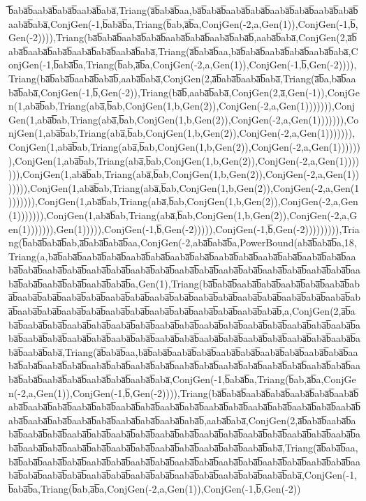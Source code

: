 ̅b̅aba̅b̅aaba̅b̅aba̅b̅aaba̅b̅aba̅,Triang(a̅b̅aba̅b̅aa,ba̅b̅aba̅b̅aaba̅b̅aba̅b̅aaba̅b̅aba̅b̅aaba̅b̅aba̅b̅aaba̅b̅aba̅,ConjGen(-1,b̅aba̅b̅a,Triang(b̅ab,a̅b̅a,ConjGen(-2,a,Gen(1)),ConjGen(-1,b̅,Gen(-2)))),Triang(ba̅b̅aba̅b̅aaba̅b̅aba̅b̅aaba̅b̅aba̅b̅aaba̅b̅aba̅b̅,aaba̅b̅aba̅,ConjGen(2,a̅b̅aba̅b̅aaba̅b̅aba̅b̅aaba̅b̅aba̅b̅aaba̅b̅aba̅,Triang(a̅b̅aba̅b̅aa,ba̅b̅aba̅b̅aaba̅b̅aba̅b̅aaba̅b̅aba̅,ConjGen(-1,b̅aba̅b̅a,Triang(b̅ab,a̅b̅a,ConjGen(-2,a,Gen(1)),ConjGen(-1,b̅,Gen(-2)))),Triang(ba̅b̅aba̅b̅aaba̅b̅aba̅b̅,aaba̅b̅aba̅,ConjGen(2,a̅b̅aba̅b̅aaba̅b̅aba̅,Triang(a̅b̅a,ba̅b̅aaba̅b̅aba̅,ConjGen(-1,b̅,Gen(-2)),Triang(ba̅b̅,aaba̅b̅aba̅,ConjGen(2,a̅,Gen(-1)),ConjGen(1,aba̅b̅ab,Triang(aba̅,b̅ab,ConjGen(1,b,Gen(2)),ConjGen(-2,a,Gen(1))))))),ConjGen(1,aba̅b̅ab,Triang(aba̅,b̅ab,ConjGen(1,b,Gen(2)),ConjGen(-2,a,Gen(1))))))),ConjGen(1,aba̅b̅ab,Triang(aba̅,b̅ab,ConjGen(1,b,Gen(2)),ConjGen(-2,a,Gen(1))))))),ConjGen(1,aba̅b̅ab,Triang(aba̅,b̅ab,ConjGen(1,b,Gen(2)),ConjGen(-2,a,Gen(1))))))),ConjGen(1,aba̅b̅ab,Triang(aba̅,b̅ab,ConjGen(1,b,Gen(2)),ConjGen(-2,a,Gen(1))))))),ConjGen(1,aba̅b̅ab,Triang(aba̅,b̅ab,ConjGen(1,b,Gen(2)),ConjGen(-2,a,Gen(1))))))),ConjGen(1,aba̅b̅ab,Triang(aba̅,b̅ab,ConjGen(1,b,Gen(2)),ConjGen(-2,a,Gen(1))))))),ConjGen(1,aba̅b̅ab,Triang(aba̅,b̅ab,ConjGen(1,b,Gen(2)),ConjGen(-2,a,Gen(1))))))),ConjGen(1,aba̅b̅ab,Triang(aba̅,b̅ab,ConjGen(1,b,Gen(2)),ConjGen(-2,a,Gen(1))))))),Gen(1))))),ConjGen(-1,b̅,Gen(-2))))),ConjGen(-1,b̅,Gen(-2))))))))),Triang(b̅aba̅b̅aba̅b̅ab,a̅b̅aba̅b̅aba̅b̅aa,ConjGen(-2,aba̅b̅aba̅b̅a,PowerBound(aba̅b̅aba̅b̅a,18,Triang(a,ba̅b̅aba̅b̅aaba̅b̅aba̅b̅aaba̅b̅aba̅b̅aaba̅b̅aba̅b̅aaba̅b̅aba̅b̅aaba̅b̅aba̅b̅aaba̅b̅aba̅b̅aaba̅b̅aba̅b̅aaba̅b̅aba̅b̅aaba̅b̅aba̅b̅aaba̅b̅aba̅b̅aaba̅b̅aba̅b̅aaba̅b̅aba̅b̅aaba̅b̅aba̅b̅aaba̅b̅aba̅b̅aaba̅b̅aba̅b̅aaba̅b̅aba̅b̅aaba̅b̅aba̅b̅a,Gen(1),Triang(ba̅b̅aba̅b̅aaba̅b̅aba̅b̅aaba̅b̅aba̅b̅aaba̅b̅aba̅b̅aaba̅b̅aba̅b̅aaba̅b̅aba̅b̅aaba̅b̅aba̅b̅aaba̅b̅aba̅b̅aaba̅b̅aba̅b̅aaba̅b̅aba̅b̅aaba̅b̅aba̅b̅aaba̅b̅aba̅b̅aaba̅b̅aba̅b̅aaba̅b̅aba̅b̅aaba̅b̅aba̅b̅aaba̅b̅aba̅b̅aaba̅b̅aba̅b̅aaba̅b̅aba̅b̅,a,ConjGen(2,a̅b̅aba̅b̅aaba̅b̅aba̅b̅aaba̅b̅aba̅b̅aaba̅b̅aba̅b̅aaba̅b̅aba̅b̅aaba̅b̅aba̅b̅aaba̅b̅aba̅b̅aaba̅b̅aba̅b̅aaba̅b̅aba̅b̅aaba̅b̅aba̅b̅aaba̅b̅aba̅b̅aaba̅b̅aba̅b̅aaba̅b̅aba̅b̅aaba̅b̅aba̅b̅aaba̅b̅aba̅b̅aaba̅b̅aba̅b̅aaba̅b̅aba̅b̅aaba̅b̅aba̅,Triang(a̅b̅aba̅b̅aa,ba̅b̅aba̅b̅aaba̅b̅aba̅b̅aaba̅b̅aba̅b̅aaba̅b̅aba̅b̅aaba̅b̅aba̅b̅aaba̅b̅aba̅b̅aaba̅b̅aba̅b̅aaba̅b̅aba̅b̅aaba̅b̅aba̅b̅aaba̅b̅aba̅b̅aaba̅b̅aba̅b̅aaba̅b̅aba̅b̅aaba̅b̅aba̅b̅aaba̅b̅aba̅b̅aaba̅b̅aba̅b̅aaba̅b̅aba̅b̅aaba̅b̅aba̅,ConjGen(-1,b̅aba̅b̅a,Triang(b̅ab,a̅b̅a,ConjGen(-2,a,Gen(1)),ConjGen(-1,b̅,Gen(-2)))),Triang(ba̅b̅aba̅b̅aaba̅b̅aba̅b̅aaba̅b̅aba̅b̅aaba̅b̅aba̅b̅aaba̅b̅aba̅b̅aaba̅b̅aba̅b̅aaba̅b̅aba̅b̅aaba̅b̅aba̅b̅aaba̅b̅aba̅b̅aaba̅b̅aba̅b̅aaba̅b̅aba̅b̅aaba̅b̅aba̅b̅aaba̅b̅aba̅b̅aaba̅b̅aba̅b̅aaba̅b̅aba̅b̅aaba̅b̅aba̅b̅,aaba̅b̅aba̅,ConjGen(2,a̅b̅aba̅b̅aaba̅b̅aba̅b̅aaba̅b̅aba̅b̅aaba̅b̅aba̅b̅aaba̅b̅aba̅b̅aaba̅b̅aba̅b̅aaba̅b̅aba̅b̅aaba̅b̅aba̅b̅aaba̅b̅aba̅b̅aaba̅b̅aba̅b̅aaba̅b̅aba̅b̅aaba̅b̅aba̅b̅aaba̅b̅aba̅b̅aaba̅b̅aba̅b̅aaba̅b̅aba̅b̅aaba̅b̅aba̅,Triang(a̅b̅aba̅b̅aa,ba̅b̅aba̅b̅aaba̅b̅aba̅b̅aaba̅b̅aba̅b̅aaba̅b̅aba̅b̅aaba̅b̅aba̅b̅aaba̅b̅aba̅b̅aaba̅b̅aba̅b̅aaba̅b̅aba̅b̅aaba̅b̅aba̅b̅aaba̅b̅aba̅b̅aaba̅b̅aba̅b̅aaba̅b̅aba̅b̅aaba̅b̅aba̅b̅aaba̅b̅aba̅b̅aaba̅b̅aba̅,ConjGen(-1,b̅aba̅b̅a,Triang(b̅ab,a̅b̅a,ConjGen(-2,a,Gen(1)),ConjGen(-1,b̅,Gen(-2))